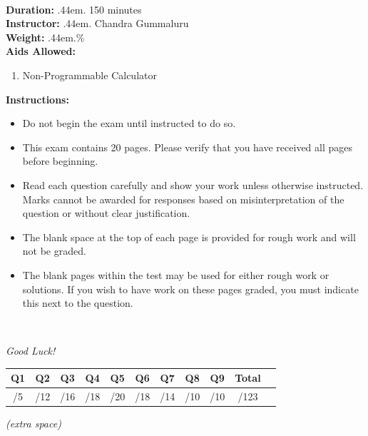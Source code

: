 \documentclass[12pt]{article}
\makeatletter
\newcommand\cdotfill{%
    \leavevmode\cleaders\hb@xt@.44em{\hss$.$\hss}\hfill\kern\z@
}
\makeatother
\begin{document}
\begin{minipage}{0.6\textwidth}
\begin{tabular}{|c|c|c|c|c|c|c|c|c|c|}
  \hspace{1.2em}\; & \hspace{1.2em}\; & \hspace{1.2em}\; & \hspace{1.2em}\; & \hspace{1.2em}\; & \hspace{1.2em}\; & \hspace{1.2em}\; & \hspace{1.2em}\; & \hspace{1.2em}\; & \hspace{1.2em}\;\\
  \hline
\end{tabular}
\end{minipage}
\\[0.75cm]
\noindent \textbf{Duration:}\cdotfill {150 minutes}\\
\textbf{Instructor:}\cdotfill Chandra Gummaluru\\
\textbf{Weight:}\cdotfill 40\% \\
\textbf{Aids Allowed:}
\begin{enumerate}
    \item[(1)] Non-Programmable Calculator
\end{enumerate}
\textbf{Instructions:}
\begin{itemize}
    \item Do not begin the exam until instructed to do so.
    \item This exam contains 20 pages. Please verify that you have received all pages before beginning.
    \item Read each question carefully and show your work unless otherwise instructed. Marks cannot be awarded for responses based on misinterpretation of the question or without clear justification.
    \item The blank space at the top of each page is provided for rough work and will not be graded.
    \item The blank pages within the test may be used for either rough work or solutions. If you wish to have work on these pages graded, you must indicate this next to the question.
\end{itemize}
\\[0.25cm]
\begin{center}
    \textit{Good Luck!}
\end{center}

\vfill
\begin{center}
\begin{tabular}{|c|c|c|c|c|c|c|c|c|c|c|}
  \hline
  \textbf{Q1} & \textbf{Q2} & \textbf{Q3} & \textbf{Q4} & \textbf{Q5} &
  \textbf{Q6} & \textbf{Q7} & \textbf{Q8} & \textbf{Q9} & \textbf{Total} \\
  \hline
  /5 & /12 & /16 & /18 & /20 & /18 & /14 & /10 & /10 & /123 \\[1.2em]
  \hline
\end{tabular}
\end{center}

\clearpage



\clearpage

\begin{center}
    \textit{(extra space)}
\end{center}
\end{document}

